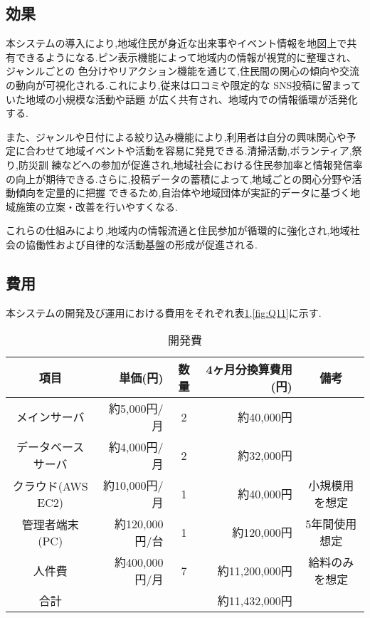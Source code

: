 \subsection{効果}
本システムの導入により,地域住民が身近な出来事やイベント情報を地図上で共有できるようになる.ピン表示機能によって地域内の情報が視覚的に整理され、ジャンルごとの
色分けやリアクション機能を通じて,住民間の関心の傾向や交流の動向が可視化される.これにより,従来は口コミや限定的な SNS投稿に留まっていた地域の小規模な活動や話題
が広く共有され、地域内での情報循環が活発化する.\par
また、ジャンルや日付による絞り込み機能により,利用者は自分の興味関心や予定に合わせて地域イベントや活動を容易に発見できる.清掃活動,ボランティア,祭り,防災訓
練などへの参加が促進され,地域社会における住民参加率と情報発信率の向上が期待できる.さらに,投稿データの蓄積によって,地域ごとの関心分野や活動傾向を定量的に把握
できるため,自治体や地域団体が実証的データに基づく地域施策の立案・改善を行いやすくなる. \par
これらの仕組みにより,地域内の情報流通と住民参加が循環的に強化され,地域社会の協働性および自律的な活動基盤の形成が促進される.

\subsection{費用}
本システムの開発及び運用における費用をそれぞれ表\ref{fig:Q10},\ref{fig:Q11}に示す.
\clearpage

\begin{table}[h]
  \centering
  \caption{開発費}
  \label{fig:Q10}
  \begin{tabular}{crcrc}
  \hline
  項目  & 単価(円) & 数量   & 4ヶ月分換算費用(円) & 備考\\ \hline\hline
  
メインサーバ  & 約5,000円/月 & 2  & 約40,000円&  \\ \hline

データベースサーバ & 約4,000円/月 & 2  & 約32,000円& \\\hline

クラウド(AWS EC2) &約10,000円/月 &1 & 約40,000円& 小規模用を想定\\ \hline

管理者端末(PC) & 約120,000円/台& 1& 約120,000円& 5年間使用想定 \\ \hline

人件費　 & 約400,000円/月 & 7& 約11,200,000円& 給料のみを想定\\ \hline\hline

合計　& & & 約11,432,000円\\ \hline
\end{tabular}
\end{table}



